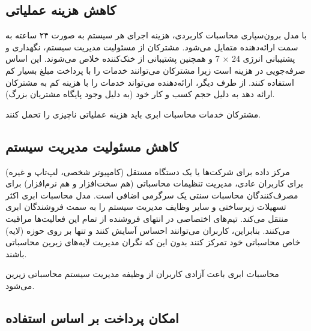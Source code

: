 \documentclass{book}
\begin{document}
            \subsection{کاهش هزینه عملیاتی}

                با مدل برون‌سپاری محاسبات کاربردی، هزینه اجرای هر سیستم به صورت ۲۴ ساعته به سمت ارائه‌دهنده متمایل می‌شود. مشترکان از مسئولیت مدیریت سیستم، نگهداری و پشتیبانی انرژی 24 × 7 و همچنین پشتیبانی از خنک‌کننده خلاص می‌شوند. این اساس صرفه‌جویی در هزینه است زیرا مشترکان می‌توانند خدمات را با پرداخت مبلغ بسیار کم استفاده کنند. از طرف دیگر، ارائه‌دهنده می‌تواند خدمات را با هزینه کم به مشترکان ارائه دهد به دلیل حجم کسب و کار خود (به دلیل وجود پایگاه مشتریان بزرگ).

                \begin{addinfo}
                    
                    مشترکان خدمات محاسبات ابری باید هزینه عملیاتی ناچیزی را تحمل کنند.

                \end{addinfo}

            \subsection{کاهش مسئولیت مدیریت سیستم}

                مرکز داده برای شرکت‌ها یا یک دستگاه مستقل (کامپیوتر شخصی، لپ‌تاپ و غیره) برای کاربران عادی، مدیریت تنظیمات محاسباتی (هم سخت‌افزار و هم نرم‌افزار) برای مصرف‌کنندگان محاسبات سنتی یک سرگرمی اضافی است. مدل محاسبات ابری اکثر تسهیلات زیرساختی و سایر وظایف مدیریت سیستم را به سمت فروشندگان ابری منتقل می‌کند. تیم‌های اختصاصی در انتهای فروشنده از تمام این فعالیت‌ها مراقبت می‌کنند. بنابراین، کاربران می‌توانند احساس آسایش کنند و تنها بر روی حوزه (لایه) خاص محاسباتی خود تمرکز کنند بدون این که نگران مدیریت لایه‌های زیرین محاسباتی باشند.

                \begin{addinfo}
                    
                    محاسبات ابری باعث آزادی کاربران از وظیفه مدیریت سیستم محاسباتی زیرین می‌شود.

                \end{addinfo}
                


    \subsection{امکان پرداخت بر اساس استفاده}
\end{document}
